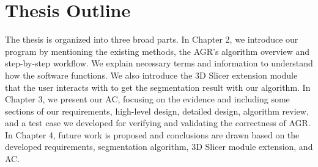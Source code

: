 \section{Thesis Outline} \label{TO}

The thesis is organized into three broad parts. In Chapter 2, we introduce our program \progname{} by mentioning the existing methods, the AGR's algorithm overview and step-by-step  workflow. We explain necessary terms and information to understand how the software functions. We also introduce the 3D Slicer \cite{Kikinis2014} extension module that the user interacts with to get the segmentation result with our algorithm. In Chapter 3, we present our AC, focusing on the evidence and including  some sections of our requirements, high-level design, detailed design, algorithm review, and a test case we developed for verifying and validating the correctness of AGR. In Chapter 4, future work is proposed and conclusions are drawn based on the developed requirements, segmentation algorithm, 3D Slicer module extension, and AC.